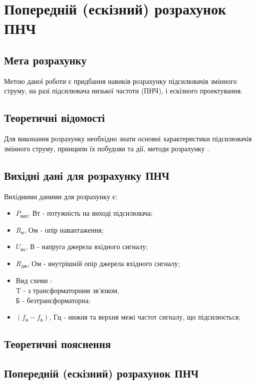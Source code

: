 \documentclass[main.tex]{subfiles}
\begin{document}
\section{Попередній (ескізний) розрахунок ПНЧ}

\subsection{Мета розрахунку}

Метою даної роботи є придбання навиків розрахунку підсилювачів змінного струму, на разі підсилювача низької частоти (ПНЧ), і ескізного проектування.

\subsection{Теоретичні відомості}

Для виконання розрахунку необхідно знати основні характеристики підсилювачів змінного струму, принципи їх побудови та дії, методи розрахунку \cite{electronics_handbook}.

\subsection{Вихідні дані для розрахунку ПНЧ}

Вихідними даними для розрахунку є:
\begin{itemize}
    \item $P_\text{вих}$, Вт - потужність на виході підсилювача;
    \item $R_\text{н}$, Ом - опір навантаження;
    \item $U_\text{вх}$, В - напруга джерела вхідного сигналу;
    \item $R_{\text{дж}}$, Ом - внутрішній опір джерела вхідного сигналу;
    \item $\text{Вид схеми}$ : \\T - з трансформаторним зв'язком, \\Б - безтрансформаторна;
    \item $(f_{\text{н}} - f_{\text{в}})$,  Гц - нижня та верхня межі частот сигналу, що підсилюється;
\end{itemize}

\subsection{Теоретичні пояснення}

\subsection{Попередній (ескізний) розрахунок ПНЧ}
\end{document}
